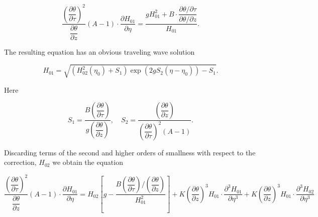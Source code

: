 \begin{equation}
\frac{\left( \dfrac{\partial \theta}{\partial \tau} \right)^2}{\dfrac{\partial \theta}{\partial z}} (A - 1) \cdot \frac{\partial H_{01}}{\partial \eta}
= \frac{g H_{01}^2 + B \cdot \dfrac{\partial \theta / \partial \tau}{\partial \theta / \partial z}}{H_{01}}.
\end{equation}

The resulting equation has an obvious traveling wave solution

\begin{equation}
H_{01} = \sqrt{
\left( H_{02}^2(\eta_0) + S_1 \right)
\exp\left( 2g S_2 (\eta - \eta_0) \right)
- S_1
}.
\end{equation}

Here

\begin{equation}
S_1 = \frac{B \left( \dfrac{\partial \theta}{\partial \tau} \right)}{g \left( \dfrac{\partial \theta}{\partial z} \right)}, \quad
S_2 = \frac{\left( \dfrac{\partial \theta}{\partial z} \right)}{\left( \dfrac{\partial \theta}{\partial \tau} \right)^2 (A - 1)}.
\end{equation}

Discarding terms of the second and higher orders of smallness with
respect to the correction, $H_{02}$ we obtain the equation

\begin{equation}
\frac{\left( \dfrac{\partial \theta}{\partial \tau} \right)^2}{\dfrac{\partial \theta}{\partial z}} (A - 1) \cdot \frac{\partial H_{01}}{\partial \eta}
= H_{02} \left[ g - \frac{B \left( \dfrac{\partial \theta}{\partial \tau} \right) / \left( \dfrac{\partial \theta}{\partial z} \right)}{H_{01}^2} \right]
+ K \left( \frac{\partial \theta}{\partial z} \right)^3 H_{01} \cdot \frac{\partial^3 H_{01}}{\partial \eta^3}
+ K \left( \frac{\partial \theta}{\partial z} \right)^3 H_{01} \cdot \frac{\partial^3 H_{02}}{\partial \eta^3}
\end{equation}

